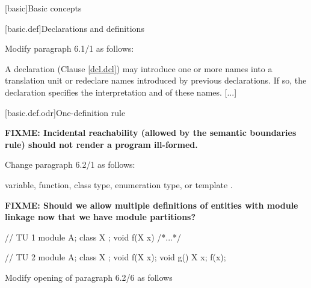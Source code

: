 \setcounter{chapter}{5}
[basic]{Basic concepts}

[basic.def]{Declarations and definitions}

Modify paragraph 6.1/1 as follows:

\begin{std.txt}
  \pnum[1]
  A declaration (Clause \ref{dcl.dcl}) may introduce one or more names into a
  translation unit or redeclare names introduced by previous declarations.
  If so, the declaration specifies the interpretation and
   of these names.
  [...]
  \end{std.txt}

[basic.def.odr]{One-definition rule}

\textbf{\color{red}FIXME: Incidental reachability (allowed
by the semantic boundaries rule) should not render a program
ill-formed.}

Change paragraph 6.2/1 as follows:
\begin{std.txt}
  \pnum[1]
  variable, function, class type, enumeration type, or template
  .
\end{std.txt}

\textbf{\color{red}FIXME: Should we allow multiple definitions
of entities with module linkage now that we have module partitions?}

\begin{example}
\begin{codeblock}
// TU 1
module A;
class X {};
void f(X x) { /*...*/ }

// TU 2
module A;
class X {};
void f(X x);
void g() { X x; f(x); }
\end{codeblock}
\end{example}

Modify opening of paragraph 6.2/6 as follows

